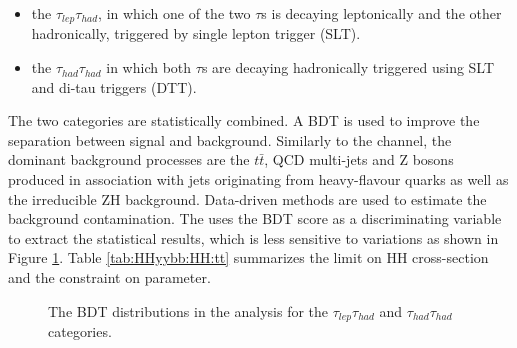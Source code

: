 \begin{itemize}
    \item the $\tau_{lep}\tau_{had}$, in which one of the two $\tau$s is decaying leptonically and the other hadronically, triggered by single lepton trigger (SLT).
    \item the $\tau_{had}\tau_{had}$ in which both $\tau$s are decaying hadronically triggered using SLT and di-tau triggers (DTT).
\end{itemize}
The two categories are statistically combined. A BDT is used to improve the separation between signal and background. Similarly to the \bbbb channel, the dominant background processes are the $t\bar{t}$, QCD multi-jets and Z bosons produced in association with jets originating from heavy-flavour quarks as well as the irreducible ZH background. Data-driven methods are used to estimate the background contamination. The \bbtt uses the BDT score as a discriminating variable to extract the statistical results, which is less sensitive to \kl variations as shown in Figure \ref{fig:HHyybb:HH:tt}. Table \ref{tab:HHyybb:HH:tt} summarizes the limit on HH cross-section and the constraint on \kl parameter.

\begin{figure}[htbp]
    \centering
    \caption{The BDT distributions in the \bbtt analysis for the $\tau_{lep}\tau_{had}$ and $\tau_{had}\tau_{had}$ categories.}
    \label{fig:HHyybb:HH:tt}
\end{figure}

